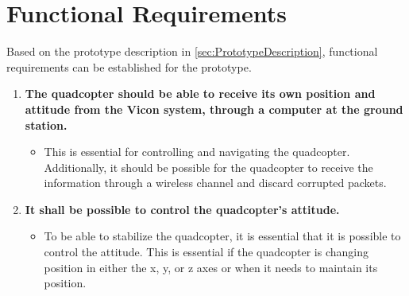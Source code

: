 \chapter{Functional Requirements}
\label{ch:functionalRequirements}
Based on the prototype description in  \autoref{sec:PrototypeDescription}, functional requirements can be established for the prototype.

\begin{enumerate}[label=\textbf{\arabic*})]

\item \textbf{The quadcopter should be able to receive its own position and attitude from the Vicon system, through a computer at the ground station.}
\begin{itemize}
\item[] %
This is essential for controlling and navigating the quadcopter. Additionally, it should be possible for the quadcopter to receive the information through a wireless channel and discard corrupted packets.  %
\end{itemize}



\item \textbf{It shall be possible to control the quadcopter's attitude.}
\begin{itemize}
\item[] To be able to stabilize the quadcopter, it is essential that it is possible to control the attitude. This is essential if the quadcopter is changing position in either the x, y, or z axes or when it needs to maintain its position. 
\end{itemize}


\end{enumerate}
